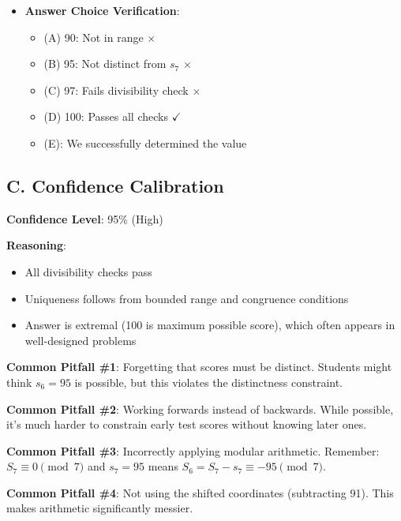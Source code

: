 \documentclass[11pt]{article}
\begin{document}
\begin{verificationbox}
\begin{itemize}[leftmargin=*]
    \item \textbf{Answer Choice Verification}:
    \begin{itemize}
        \item (A) 90: Not in range $\times$
        \item (B) 95: Not distinct from $s_7$ $\times$
        \item (C) 97: Fails divisibility check $\times$
        \item (D) 100: Passes all checks $\checkmark$
        \item (E): We successfully determined the value
    \end{itemize}
\end{itemize}

\subsection*{C. Confidence Calibration}
\textbf{Confidence Level}: 95\% (High)

\textbf{Reasoning}:
\begin{itemize}
    \item All divisibility checks pass
    \item Uniqueness follows from bounded range and congruence conditions
    \item Answer is extremal (100 is maximum possible score), which often appears in well-designed problems
\end{itemize}
\end{verificationbox}

\begin{warningbox}
\textbf{Common Pitfall \#1}: Forgetting that scores must be distinct. Students might think $s_6 = 95$ is possible, but this violates the distinctness constraint.

\textbf{Common Pitfall \#2}: Working forwards instead of backwards. While possible, it's much harder to constrain early test scores without knowing later ones.

\textbf{Common Pitfall \#3}: Incorrectly applying modular arithmetic. Remember: $S_7 \equiv 0 \pmod{7}$ and $s_7 = 95$ means $S_6 = S_7 - s_7 \equiv -95 \pmod{7}$.

\textbf{Common Pitfall \#4}: Not using the shifted coordinates (subtracting 91). This makes arithmetic significantly messier.
\end{warningbox}
\end{document}
